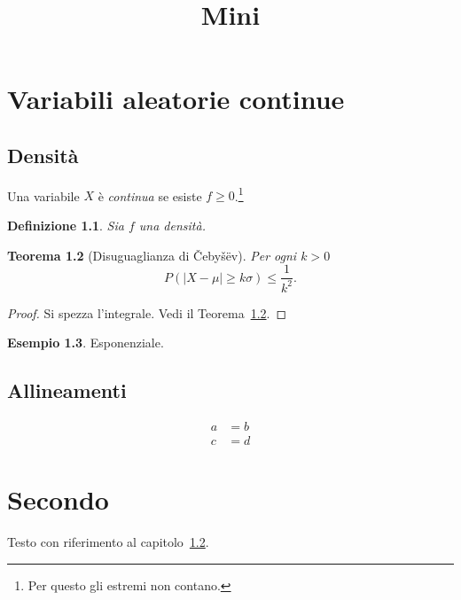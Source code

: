 \documentclass{report}
\title{Mini}
\newtheorem{theorem}{Teorema}[chapter]
\newtheorem{definition}[theorem]{Definizione}
\theoremstyle{definition}
\newtheorem{example}[theorem]{Esempio}
\begin{document}
\chapter{Variabili aleatorie continue}
\section{Densità}
Una variabile $X$ è \emph{continua} se esiste $f\ge 0$.\footnote{Per questo gli estremi non contano.}
\begin{definition}
Sia $f$ una densità.
\end{definition}
\begin{theorem}[Disuguaglianza di Čebyšëv]\label{thm:c}
Per ogni $k>0$
\begin{equation}
P(|X-\mu|\ge k\sigma)\le \frac1{k^2}.
\end{equation}
\end{theorem}
\begin{proof}
Si spezza l'integrale. Vedi il Teorema~\ref{thm:c}.
\end{proof}
\begin{example}
Esponenziale.
\end{example}
\section{Allineamenti}
\begin{align*}
a &= b\\ c &= d
\end{align*}
\chapter{Secondo}
Testo con riferimento al capitolo~\ref{thm:c}.
\end{document}

